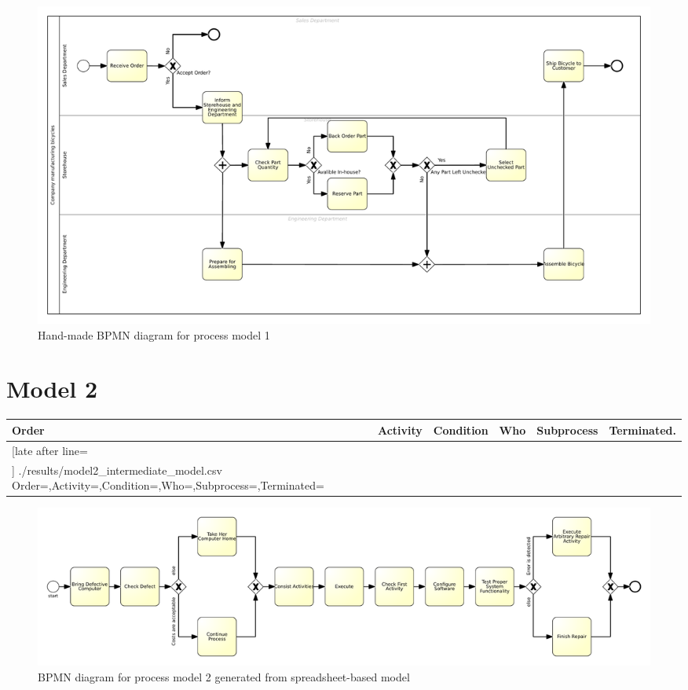 \begin{figure}[H]
	\centering
	\includegraphics[width=\hsize]{./bpmn/model1.pdf}
	\caption{Hand-made BPMN diagram for process model 1}
	\label{bpmn:model1}
\end{figure}

\section{Model 2}
\begin{tcolorbox}[
	breakable,
	arc=0mm,
	left=1pt,
	right = 1pt,
	boxrule=0mm,
	colback = {white},
	]
	\texttt{}
\end{tcolorbox}
\label{txt:model2}

{\scriptsize
	\begin{longtable}{|p{0.03 \hsize}|p{0.25 \hsize}|p{0.15 \hsize}|p{0.2 \hsize}|p{0.1 \hsize}|p{0.1 \hsize}|}
		\hline
		Order & Activity & Condition & Who & Subprocess & Terminated.
		\\\hline\hline
		\csvreader[late after line=\\\hline]
		{./results/model2_intermediate_model.csv}
		{Order=\Order,Activity=\Activity,Condition=\Condition,Who=\Who,Subprocess=\Subprocess,Terminated=\Terminated}
		{\Order & \Activity & \Condition & \Who & \Subprocess & \Terminated}
		\caption{Spreadsheet-based description for process model 2}
		\label{csv:model2}
	\end{longtable}
}

\begin{figure}[H]
	\centering
	\includegraphics[width=\hsize]{./generated_bpmn/model2.pdf}
	\caption{BPMN diagram for process model 2 generated from spreadsheet-based model}
	\label{bpmn:generated_model2}
\end{figure}

